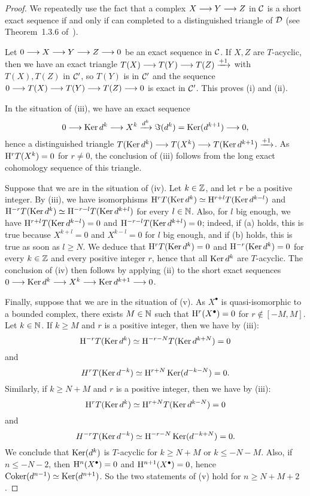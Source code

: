 \begin{proof}
We repeatedly use the fact that a complex $X\longrightarrow Y\longrightarrow Z$ in $\mathcal{C}$ is a short exact sequence if and only if can completed to a distinguished triangle of $\mathcal{D}$
(see Theorem~1.3.6 of~\cite{BBD}).

Let $0\longrightarrow X\longrightarrow Y\longrightarrow Z\longrightarrow 0$ be an exact sequence in $\mathcal{C}$. If $X,Z$ are $T$-acyclic, then we have an exact triangle $T(X)\longrightarrow T(Y)\longrightarrow T(Z)\xrightarrow{+1}$ with
$T(X),T(Z)$ in $\mathcal{C}'$, so $T(Y)$ is in $\mathcal{C}'$ and the sequence $0\longrightarrow T(X)\longrightarrow T(Y)\longrightarrow T(Z)\longrightarrow 0$ is exact in $\mathcal{C}'$. This proves (i) and (ii).

In the situation of (iii), we have an exact sequence
\[0\longrightarrow\operatorname{Ker} d^k\longrightarrow X^k\xrightarrow{d^k} \Im(d^k)=\operatorname{Ker}(d^{k+1})\longrightarrow 0,\]
hence a distinguished triangle $T(\operatorname{Ker} d^k)\longrightarrow T(X^k)\longrightarrow T(\operatorname{Ker} d^{k+1})\xrightarrow{+1}$.
As $\mathrm{H}^r T(X^k)=0$ for $r\ne 0$, the conclusion of (iii) follows from the long exact cohomology sequence of this triangle.

Suppose that we are in the situation of (iv). Let $k\in\mathbb{Z}$, and let $r$ be a positive integer. By (iii), we have isomorphisms
$\mathrm{H}^r T(\operatorname{Ker} d^k)\simeq\mathrm{H}^{r+l}T(\operatorname{Ker} d^{k-l})$ and $\mathrm{H}^{-r}T(\operatorname{Ker} d^k)\simeq\mathrm{H}^{-r-l}T(\operatorname{Ker} d^{k+l})$ for every $l\in\mathbb{N}$. Also, for $l$ big enough,
we have $\mathrm{H}^{r+l}T(\operatorname{Ker} d^{k-l})=0$ and $\mathrm{H}^{-r-l}T(\operatorname{Ker} d^{k+l})=0$; 
indeed, if (a) holds, this is true because $X^{k+l}=0$ and $X^{k-l}=0$ for $l$ big enough, and if (b) holds, this is true as soon as $l\geq N$. We deduce that $\mathrm{H}^rT(\operatorname{Ker} d^k)=0$
and $\mathrm{H}^{-r}(\operatorname{Ker} d^k)=0$ for every $k\in\mathbb{Z}$ and every positive integer $r$, hence that all $\operatorname{Ker} d^k$ are $T$-acyclic. The conclusion of (iv) then follows by applying (ii) to the short exact
sequences $0\longrightarrow\operatorname{Ker} d^k\longrightarrow X^k\longrightarrow\operatorname{Ker} d^{k+1}\longrightarrow 0$.

Finally, suppose that we are in the situation of (v). As $X^\bullet$ is quasi-isomorphic to a bounded complex, there exists $M\in\mathbb{N}$ such that $\mathrm{H}^r(X^\bullet)=0$ for $r\not\in[-M,M]$.
Let $k\in\mathbb{N}$. If $k\geq M$ and $r$ is a positive integer, then we have by (iii):
\[\mathrm{H}^{-r}T(\operatorname{Ker} d^k)\simeq\mathrm{H}^{-r-N}T(\operatorname{Ker} d^{k+N})=0\]
and
\[H^r T(\operatorname{Ker} d^{-k})\simeq\mathrm{H}^{r+N}\operatorname{Ker}(d^{-k-N})=0.\]
Similarly, if $k\geq N+M$ and $r$ is a positive integer, then we have by (iii):
\[\mathrm{H}^rT(\operatorname{Ker} d^k)\simeq\mathrm{H}^{r+N}T(\operatorname{Ker} d^{k-N})=0\]
and
\[H^{-r} T(\operatorname{Ker} d^{-k})\simeq\mathrm{H}^{-r-N}\operatorname{Ker}(d^{-k+N})=0.\]
We conclude that $\operatorname{Ker}(d^k)$ is $T$-acyclic for $k\geq N+M$ or $k\leq -N-M$. Also, if $n\leq -N-2$, then $\mathrm{H}^n(X^\bullet)=0$ and $\mathrm{H}^{n+1}(X^\bullet)=0$,
hence $\operatorname{Coker}(d^{n-1})\simeq\operatorname{Ker}(d^{n+1})$. So the two statements of (v) hold for $n\geq N+M+2$.
\end{proof}


